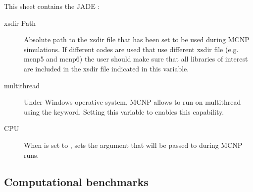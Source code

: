 \documentclass[letterpaper,10pt,english]{sphinxmanual}
\let\sphinxpxdimen\pdfpxdimen\else\newdimen\sphinxpxdimen
\begin{document}
This sheet contains the JADE :
\begin{description}
\item[{xsdir Path}] \leavevmode
Absolute path to the xsdir file that has been set to be used during MCNP simulations.
If different codes are used that use different xsdir file (e.g. mcnp5 and mcnp6) the
user should make sure that all libraries of interest are included in the xsdir file
indicated in this variable.

\item[{multithread}] \leavevmode
Under Windows operative system, MCNP allows to run on multithread using the 
keyword. Setting this variable to  enables this capability.

\item[{CPU}] \leavevmode
When  is set to ,  sets the argument that will be passed
to  during MCNP runs.

\end{description}


\subsection{Computational benchmarks}
\label{\detokenize{usage/configuration:computational-benchmarks}}\label{\detokenize{usage/configuration:compsheet}}
\noindent\sphinxincludegraphics[width=600\sphinxpxdimen]{{comp}.png}
\end{document}
